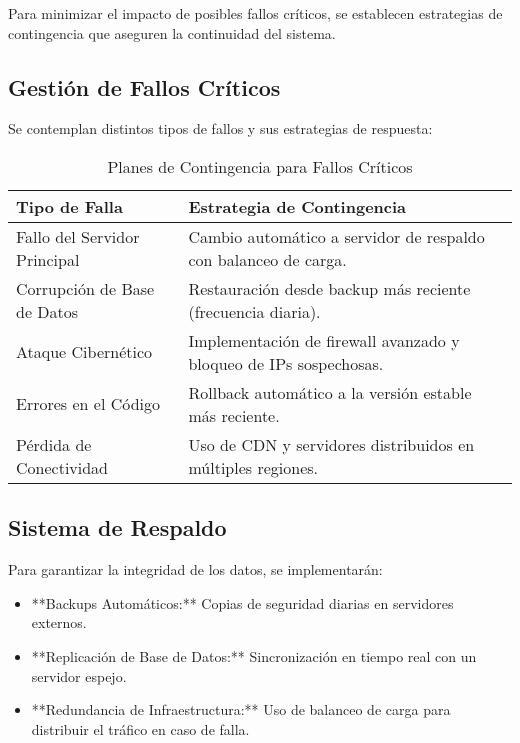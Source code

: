 Para minimizar el impacto de posibles fallos críticos, se establecen estrategias de contingencia que aseguren la continuidad del sistema.

\subsection{Gestión de Fallos Críticos}
Se contemplan distintos tipos de fallos y sus estrategias de respuesta:

\begin{table}[h]
	\centering
	\begin{tabular}{|p{5cm}|p{7cm}|}
		\hline
		\textbf{Tipo de Falla} & \textbf{Estrategia de Contingencia} \\ \hline
		Fallo del Servidor Principal & Cambio automático a servidor de respaldo con balanceo de carga. \\ \hline
		Corrupción de Base de Datos & Restauración desde backup más reciente (frecuencia diaria). \\ \hline
		Ataque Cibernético & Implementación de firewall avanzado y bloqueo de IPs sospechosas. \\ \hline
		Errores en el Código & Rollback automático a la versión estable más reciente. \\ \hline
		Pérdida de Conectividad & Uso de CDN y servidores distribuidos en múltiples regiones. \\ \hline
	\end{tabular}
	\caption{Planes de Contingencia para Fallos Críticos}
\end{table}

\subsection{Sistema de Respaldo}
Para garantizar la integridad de los datos, se implementarán:
\begin{itemize}
	\item **Backups Automáticos:** Copias de seguridad diarias en servidores externos.
	\item **Replicación de Base de Datos:** Sincronización en tiempo real con un servidor espejo.
	\item **Redundancia de Infraestructura:** Uso de balanceo de carga para distribuir el tráfico en caso de falla.
\end{itemize}

